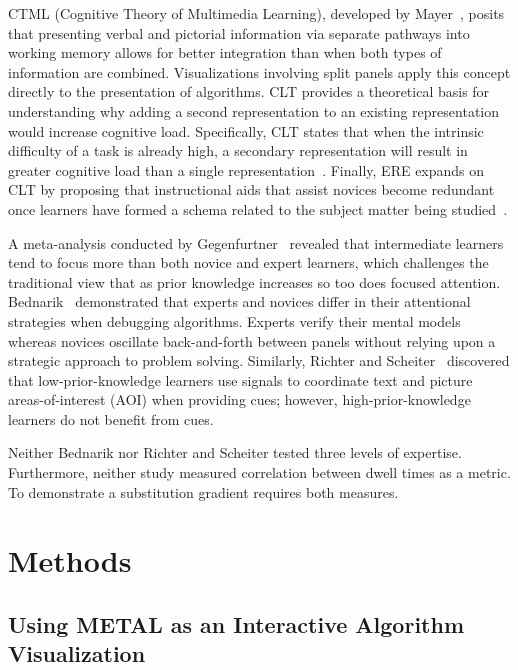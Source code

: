 \documentclass[journal]{vgtc}
\begin{document}
CTML (Cognitive Theory of Multimedia Learning), developed by
Mayer~\cite{Mayer2001Multimedia}, posits that presenting verbal and
pictorial information via separate pathways into working memory
allows for better integration than when both types of information are
combined. Visualizations involving split panels apply this concept
directly to the presentation of algorithms. CLT provides a
theoretical basis for understanding why adding a second representation
to an existing representation would increase cognitive load.
Specifically, CLT states that when the intrinsic difficulty of a task
is already high, a secondary representation will result in greater
cognitive load than a single
representation~\cite{Sweller1988Cognitive,Sweller1994Cognitive}.
Finally, ERE expands on CLT by proposing that instructional aids that
assist novices become redundant once learners have formed a schema
related to the subject matter being
studied~\cite{Kalyuga2003Expertise}.

A meta-analysis conducted by
Gegenfurtner~\cite{Gegenfurtner2011Expertise} revealed that
intermediate learners tend to focus more than both novice and expert
learners, which challenges the traditional view that as prior
knowledge increases so too does focused attention.
Bednarik~\cite{Bednarik2012Expertise} demonstrated that experts and
novices differ in their attentional strategies when debugging
algorithms. Experts verify their mental models whereas novices
oscillate back-and-forth between panels without relying upon a
strategic approach to problem solving. Similarly, Richter and
Scheiter~\cite{Richter2019Studying} discovered that
low-prior-knowledge learners use signals to coordinate text and
picture areas-of-interest (AOI) when providing cues; however,
high-prior-knowledge learners do not benefit from cues.

Neither Bednarik nor Richter and Scheiter tested three levels of
expertise. Furthermore, neither study measured correlation between
dwell times as a metric. To demonstrate a substitution gradient
requires both measures.


\section{Methods}

\subsection{Using METAL as an Interactive Algorithm Visualization}
\end{document}
